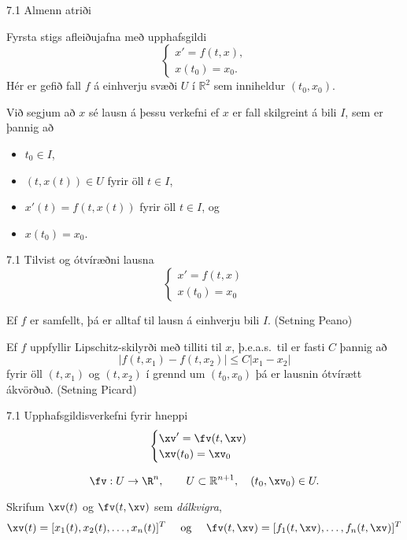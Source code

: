 \begin{frame}{7.1 Almenn atriði} 
\begin{block}{Fyrsta stigs afleiðujafna með upphafsgildi}
\begin{equation*}
\begin{cases}
x' = f(t,x),\\
x(t_0) = x_0.
\end{cases}
\end{equation*}
Hér er gefið fall $f$ á einhverju svæði $U$ í $\mathbb{R}^2$ sem
inniheldur $(t_0,x_0)$. 

\pause
\smallskip
Við segjum að $x$ sé lausn á þessu verkefni ef
$x$ er fall skilgreint á bili $I$, sem er þannig að \pause
\begin{itemize}
 \item $t_0 \in I$, \pause
 \item $(t,x(t)) \in U$ fyrir öll $t \in I$, \pause
 \item $x'(t) = f(t,x(t))$ fyrir öll $t \in I$, og\pause
 \item $x(t_0) = x_0$.
\end{itemize}
\end{block}
\end{frame}


\begin{frame}{7.1 Tilvist og ótvíræðni lausna} 
\begin{equation*}
\begin{cases}
x' = f(t,x)\\
x(t_0) = x_0
\end{cases}
\end{equation*}

Ef $f$ er samfellt, þá er alltaf til lausn á einhverju bili $I$. 
(Setning Peano)

\pause
\smallskip
Ef $f$ uppfyllir Lipschitz-skilyrði með tilliti til $x$, 
þ.e.a.s.~til er fasti $C$ þannig að 
\begin{equation*}
|f(t,x_1) - f(t,x_2)| \leq C|x_1 - x_2|
\end{equation*}
fyrir öll $(t,x_1)$ og $(t,x_2)$ í grennd um $(t_0, x_0)$ þá er
lausnin ótvírætt ákvörðuð. (Setning Picard) 
\end{frame}


\begin{frame}{7.1 Upphafsgildisverkefni fyrir hneppi} 
\begin{equation*}
\begin{cases}
\xv' =\fv(t,\xv)\\
\xv(t_0) = \xv_0
\end{cases}
\end{equation*}

$$
\fv: U \rightarrow \R^n, \qquad U\subset \mathbb{R}^{n+1}, \quad
(t_0,\xv_0) \in U.
$$ 

\pause
\smallskip
Skrifum  $\xv(t)$ og $\fv(t,\xv)$ sem {\it dálkvigra},
$$\xv(t) = [x_1(t), x_2(t), \ldots , x_n(t)]^T
\quad \text{  og } \quad 
\fv(t,\xv) = [f_1(t,\xv), \ldots , f_n(t, \xv)]^T
$$
\end{frame}


